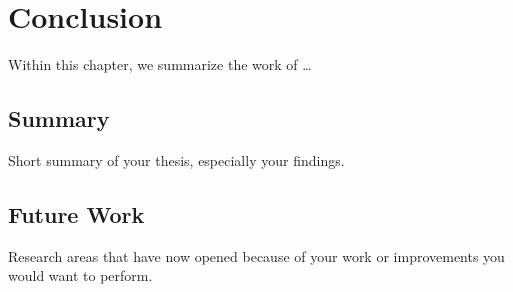 \setchaptertoc
\chapter{Conclusion}\label{chp:conclusion}
\begin{summary}
   Within this chapter, we summarize the work of \ldots
\end{summary}

\section{Summary}
Short summary of your thesis, especially your findings.

\section{Future Work}
Research areas that have now opened because of your work or improvements you would want to perform.